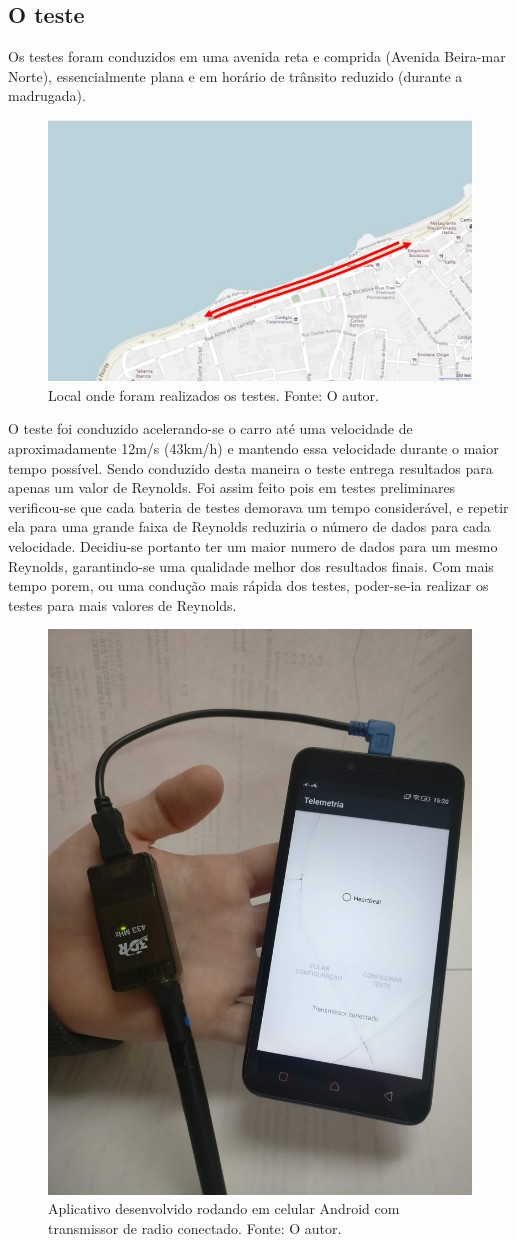 \subsection{O teste}

Os testes foram conduzidos em uma avenida reta e comprida (Avenida Beira-mar Norte), essencialmente plana e em horário de trânsito reduzido (durante a madrugada).

\begin{figure}[!ht]
    \centering
    \includegraphics[width=.5\linewidth]{figuras/internet/here_open_street_maps_setas.png}
    \caption{Local onde foram realizados os testes. Fonte: O autor.}
    \label{fig:mapa_teste}
\end{figure}

O teste foi conduzido acelerando-se o carro até uma velocidade de aproximadamente 12m/s (43km/h) e mantendo essa velocidade durante o maior tempo possível. Sendo conduzido desta maneira o teste entrega resultados para apenas um valor de Reynolds. Foi assim feito pois em testes preliminares verificou-se que cada bateria de testes demorava um tempo considerável, e repetir ela para uma grande faixa de Reynolds reduziria o número de dados para cada velocidade. Decidiu-se portanto ter um maior numero de dados para um mesmo Reynolds, garantindo-se uma qualidade melhor dos resultados finais. Com mais tempo porem, ou uma condução mais rápida dos testes, poder-se-ia realizar os testes para mais valores de Reynolds.  

\begin{figure}[!ht]
    \centering
    \includegraphics[width=.5\linewidth]{figuras/calibracao/app_celular.jpg}
    \caption{Aplicativo desenvolvido rodando em celular Android com transmissor de radio conectado. Fonte: O autor.}
    \label{fig:app_celular}
\end{figure}

